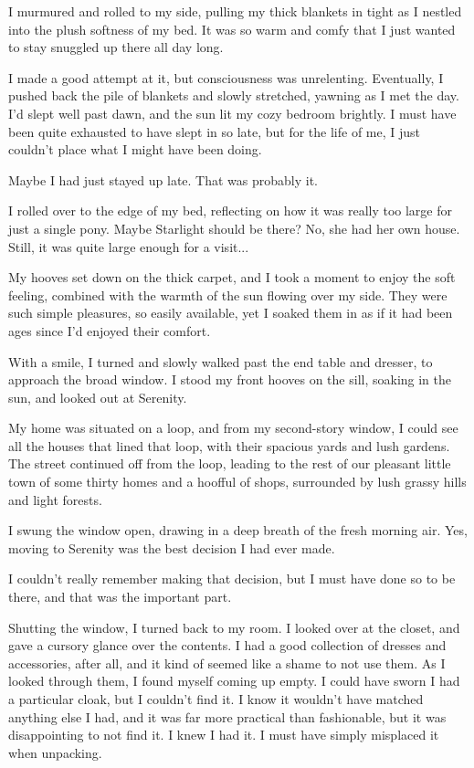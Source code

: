 I murmured and rolled to my side, pulling my thick blankets in tight as I nestled into the plush softness of my bed. It was so warm and comfy that I just wanted to stay snuggled up there all day long.

I made a good attempt at it, but consciousness was unrelenting. Eventually, I pushed back the pile of blankets and slowly stretched, yawning as I met the day. I’d slept well past dawn, and the sun lit my cozy bedroom brightly. I must have been quite exhausted to have slept in so late, but for the life of me, I just couldn’t place what I might have been doing.

Maybe I had just stayed up late. That was probably it.

I rolled over to the edge of my bed, reflecting on how it was really too large for just a single pony. Maybe Starlight should be there? No, she had her own house. Still, it was quite large enough for a visit...

My hooves set down on the thick carpet, and I took a moment to enjoy the soft feeling, combined with the warmth of the sun flowing over my side. They were such simple pleasures, so easily available, yet I soaked them in as if it had been ages since I’d enjoyed their comfort.

With a smile, I turned and slowly walked past the end table and dresser, to approach the broad window. I stood my front hooves on the sill, soaking in the sun, and looked out at Serenity.

My home was situated on a loop, and from my second-story window, I could see all the houses that lined that loop, with their spacious yards and lush gardens. The street continued off from the loop, leading to the rest of our pleasant little town of some thirty homes and a hoofful of shops, surrounded by lush grassy hills and light forests.

I swung the window open, drawing in a deep breath of the fresh morning air. Yes, moving to Serenity was the best decision I had ever made.

I couldn’t really remember making that decision, but I must have done so to be there, and that was the important part.

Shutting the window, I turned back to my room. I looked over at the closet, and gave a cursory glance over the contents. I had a good collection of dresses and accessories, after all, and it kind of seemed like a shame to not use them. As I looked through them, I found myself coming up empty. I could have sworn I had a particular cloak, but I couldn’t find it. I know it wouldn’t have matched anything else I had, and it was far more practical than fashionable, but it was disappointing to not find it. I knew I had it. I must have simply misplaced it when unpacking.

